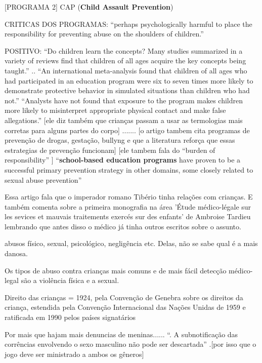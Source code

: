 [PROGRAMA 2] CAP (\textbf{Child Assault Prevention}) \cite{finkelhor2009prevention}

CRITICAS DOS PROGRAMAS: ``perhaps psychologically harmful to place the responsibility for preventing abuse on the shoulders of children.'' \cite{finkelhor2009prevention}

POSITIVO: ``Do children learn the concepts? Many studies summarized in a variety of reviews find that children of all ages acquire the key concepts being taught.''\cite{finkelhor2009prevention} .. ``An international meta-analysis found that children of all ages who had participated in an education program were six to seven times more likely to demonstrate protective behavior in simulated situations than children who had not.'' ``Analysts have not found that exposure to the program makes children more likely to misinterpret appropriate physical contact and make false allegations.'' [ele diz também que crianças passam a usar as termologias mais corretas para alguns partes do corpo]   ....... [o artigo tambem cita programas de prevenção de drogas, gestação, bullyng e que a literatura reforça que essas estrategias de prevenção funcionam] [ele tambem fala do “burden of responsibility” ] ``\textbf{school-based education programs} have proven to be a successful primary prevention strategy in other domains, some closely related to sexual abuse prevention'' \cite{finkelhor2009prevention}
 
Essa artigo fala que o imperador romano Tibério tinha relações com crianças. E também comenta sobre a primeira monografia na área 'Étude médico-légale sur les sevices et mauvais traitements exercés sur des enfants' de Ambroise Tardieu lembrando que antes disso o médico já tinha outros escritos sobre o assunto. \cite{aded2006abuso}

abusos físico, sexual, psicológico, negligência etc. Delas, não se sabe qual é a mais danosa. \cite{aded2006abuso} 

Os tipos de abuso contra crianças mais comuns e de mais fácil detecção médico-legal são a violência física e a sexual. \cite{aded2006abuso} 

Direito das crianças = 1924, pela Convenção de Genebra sobre os direitos da criança, estendida pela Convenção Internacional das Nações Unidas de 1959 e ratificada em 1990 pelos países signatários \cite{aded2006abuso} 

Por mais que hajam mais denuncias de meninas...... ``. A subnotificação das corrências envolvendo o sexo masculino não pode ser descartada'' \cite{aded2006abuso}.[por isso que o jogo deve ser ministrado a ambos os gêneros]

